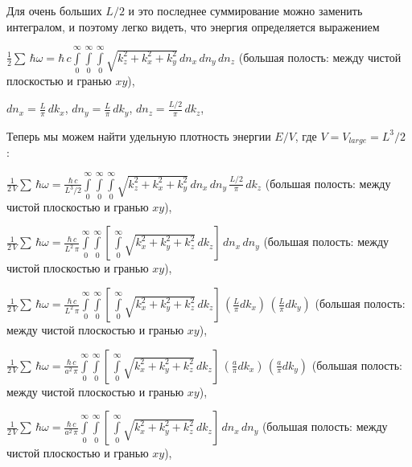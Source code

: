 \documentclass[11pt]{article}
\begin{document}
    Для очень больших \(L/2\) и это последнее суммирование можно заменить
интегралом, и поэтому легко видеть, что энергия определяется выражением

    \(\frac{1}{2}\sum\,\hbar\omega = \hbar\,c\int\limits_{0}^{\infty}\int\limits_{0}^{\infty}\int\limits_{0}^{\infty}\sqrt{k_z^2+k_x^2+k_y^2}\,d{n_x}\,d{n_y}\,d{n_z}\)
(большая полость: между чистой плоскостью и гранью \(xy\)),

    \(dn_x = \frac{L}{\pi}\,dk_x\), \(dn_y = \frac{L}{\pi}\,dk_y\),
\(dn_z = \frac{L/2}{\pi}\,dk_z\),

    Теперь мы можем найти удельную плотность энергии \(E/V\), где
\(V = V_{large} = L^3/2\) :

    \(\frac{1}{2\,V}\sum\,\hbar\omega = \frac{\hbar\,c}{L^3/2}\int\limits_{0}^{\infty}\int\limits_{0}^{\infty}\int\limits_{0}^{\infty}\sqrt{k_z^2+k_x^2+k_y^2}\,dn_x\,dn_y\,\frac{L/2}{\pi}\,dk_z\)
(большая полость: между чистой плоскостью и гранью \(xy\)),


    \(\frac{1}{2\,V}\sum\,\hbar\omega = \frac{\hbar\,c}{L^2\,\pi}\int\limits_{0}^{\infty}\int\limits_{0}^{\infty}\left[\,\int\limits_{0}^{\infty}\sqrt{k_x^2+k_y^2+k_z^2}\,dk_z\right]\,dn_x\,dn_y\)
(большая полость: между чистой плоскостью и гранью \(xy\)),

    \(\frac{1}{2\,V}\sum\,\hbar\omega = \frac{\hbar\,c}{L^2\,\pi}\int\limits_{0}^{\infty}\int\limits_{0}^{\infty}\left[\,\int\limits_{0}^{\infty}\sqrt{k_x^2+k_y^2+k_z^2}\,dk_z\right]\,\left(\frac{L}{\pi}dk_x\right)\,\left(\frac{L}{\pi}dk_y\right)\)
(большая полость: между чистой плоскостью и гранью \(xy\)),

    \(\frac{1}{2\,V}\sum\,\hbar\omega = \frac{\hbar\,c}{a^2\,\pi}\int\limits_{0}^{\infty}\int\limits_{0}^{\infty}\left[\,\int\limits_{0}^{\infty}\sqrt{k_x^2+k_y^2+k_z^2}\,dk_z\right]\,\left(\frac{a}{\pi}dk_x\right)\,\left(\frac{a}{\pi}dk_y\right)\)
(большая полость: между чистой плоскостью и гранью \(xy\)),

    \(\frac{1}{2\,V}\sum\,\hbar\omega = \frac{\hbar\,c}{a^2\,\pi}\int\limits_{0}^{\infty}\int\limits_{0}^{\infty}\left[\,\int\limits_{0}^{\infty}\sqrt{k_x^2+k_y^2+k_z^2}\,dk_z\right]\,dn_x\,dn_y\)
(большая полость: между чистой плоскостью и гранью \(xy\)),
\end{document}
